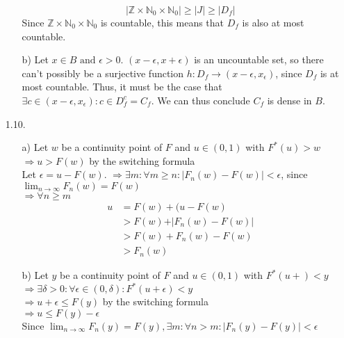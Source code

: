 \documentclass[11pt]{article}
\newcommand{\Z}{\mathbb{Z}}
\newcommand{\N}{\mathbb{N}}
\theoremstyle{definition}
\begin{document}
\begin{itemize}
\begin{itemize}
                \[\left\vert \Z \times \N_0 \times \N_0 \right\vert \geq \left\vert J \right\vert \geq \left\vert D_f \right\vert \]
                Since \(\Z \times \N_0 \times \N_0\) is countable, this means that $D_f$ is also at most countable.
            \item[b)]
                Let \(x\in B \mbox{ and } \epsilon>0\). \( (x-\epsilon,x+\epsilon) \) is an uncountable set, so there can't possibly be a surjective function \(h:D_f \to (x-\epsilon,x_\epsilon)\), 
                since $D_f$ is at most countable. Thus, it must be the case that \(\exists c\in(x-\epsilon,x_\epsilon): c\in D_f^c=C_f\). We can thus conclude $C_f$ is dense in $B$.
        \end{itemize}
    \item[1.10.]
        \begin{itemize}
            \item[a)]
                Let $w$ be a continuity point of $F$ and \(u\in(0,1)\) with \(F^*(u)>w \) \\
                \( \Rightarrow u>F(w) \) by the switching formula \\
                Let \(\epsilon = u - F(w)\).
                \( \Rightarrow \exists m : \forall m\geq n: \vert F_n(w) - F(w) \vert < \epsilon \), since \(\lim_{n\to\infty} F_n(w)=F(w) \) \\
                \( \Rightarrow \forall n \geq m \)
                \begin{align*}
                    u &= F(w) + (u - F(w) \\
                      &> F(w) + \vert F_n(w) - F(w) \vert \\
                      &> F(w) + F_n(w) - F(w) \\
                      &> F_n(w)
                \end{align*}
            \item[b)]
                Let $y$ be a continuity point of $F$ and \(u\in(0,1)\) with \(F^*(u+)<y \) \\
                \(\Rightarrow \exists \delta>0: \forall \epsilon\in (0,\delta): F^*(u+\epsilon)<y \) \\
                \(\Rightarrow u+\epsilon \leq F(y) \) by the switching formula \\
                \(\Rightarrow u \leq F(y) - \epsilon \) \\
                Since \(\lim_{n\to\infty} F_n(y)=F(y), \exists m: \forall n>m: \vert F_n(y) - F(y) \vert < \epsilon \) \\

\end{itemize}
\end{itemize}
\end{document}
